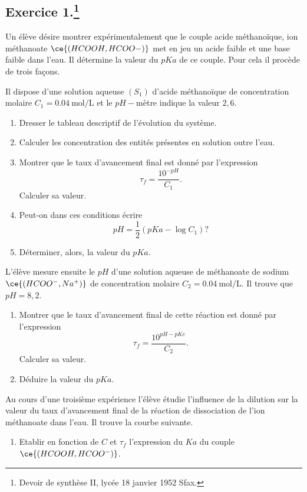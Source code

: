 \documentclass[a4paper]{article}
\begin{document}
\subsection*{Exercice 1.\footnote{Devoir de synthèse II, lycée 18 janvier 1952 Sfax.}}
Un élève désire montrer expérimentalement que le couple acide méthanoïque, ion méthanoate $\ce{(HCOOH,HCOO-)}$ met en jeu un acide faible et une base faible dans l'eau. Il détermine la valeur du $pKa$ de ce couple. Pour cela il procède de trois façons.
\begin{enumerate}
\item Il dispose d'une solution aqueuse $(S_1)$ d'acide méthanoïque de concentration molaire $C_1=\SI{0.04}{\mol\per\L}$ et le $pH-$mètre indique la valeur $2,6$.
		\begin{enumerate}[label=(\alph*)]
			\item Dresser le tableau descriptif de l'évolution du système.
			\item Calculer les concentration des entités présentes en solution outre l'eau.
			\item Montrer que le taux d'avancement final est donné par l'expression \[
					\tau_f=\frac{10^{-pH}}{C_1}
			.\] 
			Calculer sa valeur.
		\item Peut-on dans ces conditions écrire \[
				pH=\frac{1}{2}(pKa-\log C_1)
		?\] 
		\item Déterminer, alors, la valeur du $pKa$.
		\end{enumerate}
	\item L'élève mesure ensuite le $pH$ d'une solution aqueuse de méthanoate de sodium $\ce{(HCOO^-,Na^+)}$ de concentration molaire  $C_2=\SI{0.04}{\mol\per\L}$. Il trouve que $pH=8,2$.
		\begin{enumerate}[label=(\alph*)]
			\item Montrer que le taux d'avancement final de cette réaction est donné par l'expression \[
					\tau_f=\frac{10^{pH-pKe}}{C_2}
			.\] Calculer sa valeur.
		\item Déduire la valeur du $pKa$.
		\end{enumerate}
		\begin{minipage}{0.5\textwidth}
	\item Au cours d'une troisième expérience l'élève étudie l'influence de la dilution sur la valeur du taux d'avancement final de la réaction de dissociation de l'ion méthanoate dans l'eau. Il trouve la courbe suivante.
		\begin{enumerate}[label=(\alph*)]
			\item Etablir en fonction de $C$ et $\tau_f$ l'expression du $Ka$ du couple $\ce{(HCOOH,HCOO^-)}$.

\end{enumerate}
\end{minipage}
\end{enumerate}
\end{document}
